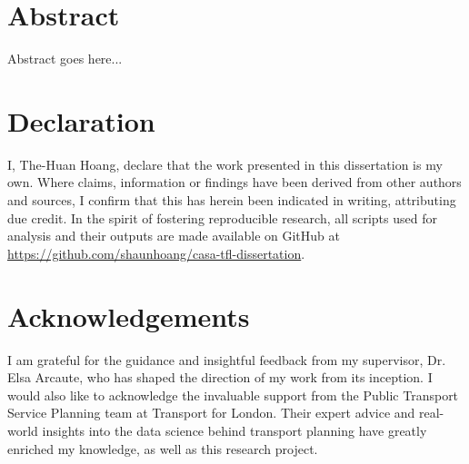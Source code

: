 \chapter*{Abstract}
Abstract goes here...

\chapter*{Declaration}
I, The-Huan Hoang, declare that the work presented in this dissertation is my own. Where claims, information or findings have been derived from other authors and sources, I confirm that this has herein been indicated in writing, attributing due credit. In the spirit of fostering reproducible research, all scripts used for analysis and their outputs are made available on GitHub at \url{https://github.com/shaunhoang/casa-tfl-dissertation}.

\chapter*{Acknowledgements}
I am grateful for the guidance and insightful feedback from my supervisor, Dr. Elsa Arcaute, who has shaped the direction of my work from its inception. I would also like to acknowledge the invaluable support from the Public Transport Service Planning team at Transport for London. Their expert advice and real-world insights into the data science behind transport planning have greatly enriched my knowledge, as well as this research project.

\tableofcontents
\listoffigures
\listoftables